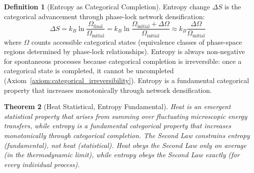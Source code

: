 \documentclass[12pt,a4paper]{article}
\newtheorem{theorem}{Theorem}[section]
\theoremstyle{definition}
\newtheorem{definition}[theorem]{Definition}
\theoremstyle{remark}
\begin{document}
\begin{definition}[Entropy as Categorical Completion]
\label{def:entropy_categorical}
Entropy change $\Delta S$ is the categorical advancement through phase-lock network densification:
\begin{equation}
\Delta S = k_B \ln \frac{\Omega_{\text{final}}}{\Omega_{\text{initial}}} = k_B \ln \frac{\Omega_{\text{initial}} + \Delta \Omega}{\Omega_{\text{initial}}} \approx k_B \frac{\Delta \Omega}{\Omega_{\text{initial}}}
\label{eq:entropy_categorical}
\end{equation}
where $\Omega$ counts accessible categorical states (equivalence classes of phase-space regions determined by phase-lock relationships). Entropy is always non-negative for spontaneous processes because categorical completion is irreversible: once a categorical state is completed, it cannot be uncompleted (Axiom~\ref{axiom:categorical_irreversibility}). Entropy is a fundamental categorical property that increases monotonically through network densification.
\end{definition}

\begin{theorem}[Heat Statistical, Entropy Fundamental]
\label{thm:heat_statistical}
Heat is an emergent statistical property that arises from summing over fluctuating microscopic energy transfers, while entropy is a fundamental categorical property that increases monotonically through categorical completion. The Second Law constrains entropy (fundamental), not heat (statistical). Heat obeys the Second Law only on average (in the thermodynamic limit), while entropy obeys the Second Law exactly (for every individual process).
\end{theorem}
\end{document}
